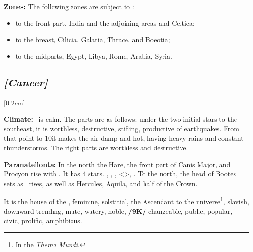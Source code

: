 \textbf{Zones:} The following zones are subject to \Gemini: 
\begin{itemize}
\item to the front part, India and the adjoining areas and Celtica; 
\item to the breast, Cilicia, Galatia, Thrace, and Boeotia; 
\item to the midparts, Egypt, Libya, Rome, Arabia, Syria.
\end{itemize}

\secbr
\subsection{\textit{[Cancer]}}
[0.2cm]

\textbf{Climate:}  \Cancer\, is calm. The parts are as follows: under the two initial stars to the southeast, it is worthless, destructive, stifling, productive of earthquakes. From that point to 10\deg it makes the air damp and hot, having heavy rains and constant thunderstorms. The right parts are worthless and destructive. 

\textbf{Paranatellonta:} In the north the Hare, the front part of Canis Major, and Procyon rise with \Cancer. It has 4 stars. \Mars, \Mercury, \Jupiter, <\Neptune>, \Venus. To the north, the head of Bootes sets as \Cancer\, rises, as well as Hercules, Aquila, and half of the Crown.

It is the house of the \Moon,  feminine,  solstitial, the Ascendant to the universe\footnote{In the \textit{Thema Mundi}.},  slavish, downward trending,  mute,  watery, noble, \textbf{/9K/} changeable, public, popular, civic,  prolific, amphibious. 

